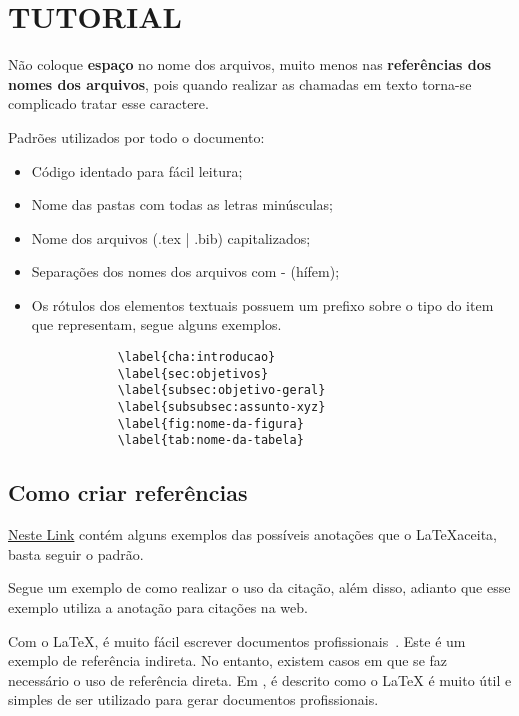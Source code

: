 \section{\textbf{TUTORIAL}}
    \label{cha:tutorial}
\hypersetup{colorlinks=true, linkcolor=black, urlcolor=black}
    Não coloque \textbf{espaço} no nome dos arquivos, muito menos nas \textbf{referências dos nomes dos arquivos}, pois quando realizar as chamadas em texto torna\hyp{se} complicado tratar esse caractere.
    
    Padrões utilizados por todo o documento:
    \begin{itemize}
        \item Código identado para fácil leitura;
        \item Nome das pastas com todas as letras minúsculas;
        \item Nome dos arquivos (.tex | .bib) capitalizados;
        \item Separações dos nomes dos arquivos com - (hífem);
        \item Os rótulos dos elementos textuais possuem um prefixo sobre o tipo do item que representam, segue alguns exemplos.
        \begin{verbatim} 
            \label{cha:introducao}
            \label{sec:objetivos}
            \label{subsec:objetivo-geral}
            \label{subsubsec:assunto-xyz}
            \label{fig:nome-da-figura}
            \label{tab:nome-da-tabela}
        \end{verbatim} 
    \end{itemize}

\subsection{\textbf{Como criar referências}}
\label{sec:referencias}

\href{https://verbosus.com/bibtex-style-examples.html}{Neste Link} contém alguns exemplos das possíveis anotações que o \LaTeX aceita, basta seguir o padrão.

Segue um exemplo de como realizar o uso da citação, além disso, adianto que esse exemplo utiliza a anotação para citações na web.

Com o \LaTeX, é muito fácil escrever documentos profissionais~\cite{latex1995}. Este é um exemplo de referência indireta. No entanto, existem casos em que se faz necessário o uso de referência direta. Em , é descrito como o LaTeX é muito útil e simples de ser utilizado para gerar documentos profissionais.

